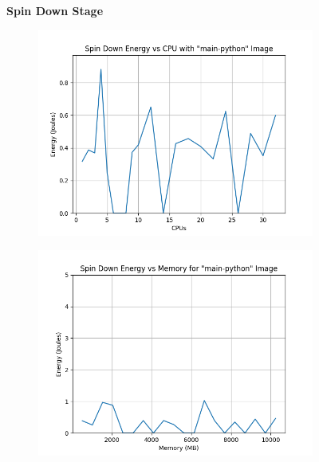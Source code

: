 \documentclass[times, 10pt,twocolumn]{article}
\begin{document}
\begin{figure}[ht]
   \textbf{Spin Down Stage}\par\medskip
   \begin{subfigure}[b]{0.3\textwidth}
      \includegraphics[width=\textwidth]{imgs/container_study/spin_down_vs_cpu.png}
     \caption{}
     \label{fig:spin_down_cpu}
   \end{subfigure}
   \hfill
   \begin{subfigure}[b]{0.3\textwidth}
      \includegraphics[width=\textwidth]{imgs/container_study/spin_down_vs_mem.png}
     \caption{}
     \label{fig:spin_down_mem}
   \end{subfigure}
   \hfill
   \begin{subfigure}[b]{0.3\textwidth}

\end{subfigure}
\end{figure}
\end{document}
